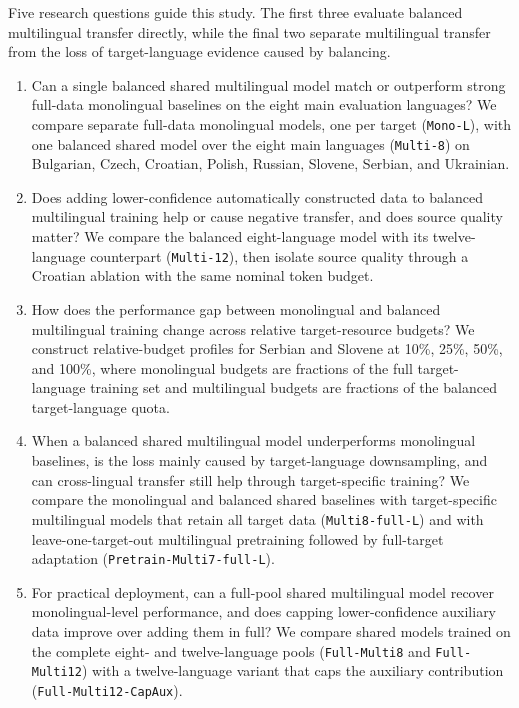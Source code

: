 \documentclass{article}
\begin{document}
Five research questions guide this study. 
The first three evaluate balanced multilingual transfer directly, while the final two separate multilingual transfer from the loss of target-language evidence caused by balancing.
\begin{enumerate}[label=\textbf{RQ\arabic*.}, leftmargin=*, itemsep=-2pt, topsep=-3pt]
    \item Can a single balanced shared multilingual model match or outperform strong full-data monolingual baselines on the eight main evaluation languages?
    We compare separate full-data monolingual models, one per target (\texttt{Mono-L}), with one balanced shared model over the eight main languages (\texttt{Multi-8}) on Bulgarian, Czech, Croatian, Polish, Russian, Slovene, Serbian, and Ukrainian.
    \item Does adding lower-confidence automatically constructed data to balanced multilingual training help or cause negative transfer, and does source quality matter?
    We compare the balanced eight-language model with its twelve-language counterpart (\texttt{Multi-12}), then isolate source quality through a Croatian ablation with the same nominal token budget.
    \item How does the performance gap between monolingual and balanced multilingual training change across relative target-resource budgets?
    We construct relative-budget profiles for Serbian and Slovene at 10\%, 25\%, 50\%, and 100\%, where monolingual budgets are fractions of the full target-language training set and multilingual budgets are fractions of the balanced target-language quota.
    \item When a balanced shared multilingual model underperforms monolingual baselines, is the loss mainly caused by target-language downsampling, and can cross-lingual transfer still help through target-specific training?
    We compare the monolingual and balanced shared baselines with target-specific multilingual models that retain all target data (\texttt{Multi8-full-L}) and with leave-one-target-out multilingual pretraining followed by full-target adaptation (\texttt{Pretrain-Multi7-full-L}).
    \item For practical deployment, can a full-pool shared multilingual model recover monolingual-level performance, and does capping lower-confidence auxiliary data improve over adding them in full?
    We compare shared models trained on the complete eight- and twelve-language pools (\texttt{Full-Multi8} and \texttt{Full-Multi12}) with a twelve-language variant that caps the auxiliary contribution (\texttt{Full-Multi12-CapAux}).
\end{enumerate}
\end{document}
